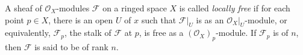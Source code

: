 \documentclass[12pt]{article}
\newcommand{\F}{\mathcal{F}}
\renewcommand{\O}{\mathcal{O}}
\begin{document}

A sheaf of $\O_X$-modules $\F$ on a ringed space $X$ is called {\em locally free} if for each point $p\in X$, there is an open 
$U$ of $x$ such that $\F|_U$ is  as an $\O_X|_U$-module, or equivalently, $\F_p$, the stalk of $\F$ at $p$, is free as a $(\O_X)_p$-module.  If $\F_p$ is of  $n$, then $\F$ is said to be of rank $n$.
\end{document}

